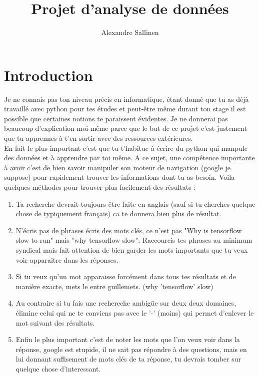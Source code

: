 \documentclass[10pt,a4paper]{book}
\author{Alexandre Sallinen}
\title{Projet d'analyse de données}
\begin{document}
\sloppy

\section{Introduction}

Je ne connais pas ton niveau précis en informatique, étant donné que tu as déjà travaillé avec python pour tes études et peut-être même durant ton stage il est possible que certaines notions te paraissent évidentes. Je ne donnerai pas beaucoup d'explication moi-même parce que le but de ce projet c'est justement que tu apprennes à t'en sortir avec des ressources extérieures.
\\
En fait le plus important c'est que tu t'habitue à écrire du python qui manpule des données et à apprendre par toi même. A ce sujet, une compétence importante à avoir c'est de bien savoir manipuler son moteur de navigation (google je suppose) pour rapidement trouver les informations dont tu as besoin. Voila quelques méthodes pour trouver plus facilement des résultats :
\begin{enumerate}
\item Ta recherche devrait toujours être faite en anglais (sauf si tu cherches quelque chose de typiquement français) ca te donnera bien plus de résultat.

\item N'écris pas de phrases écris des mots clés, ce n'est pas "Why is tensorflow slow to run" mais "why tensorflow slow". Raccourcis tes phrases au minimum syndical mais fait attention de bien garder les mots importants que tu veux voir apparaitre dans les réponses.

\item Si tu veux qu'un mot apparaisse forcément dans tous tes résultats et de manière exacte, mets le entre guillemets. (why 'tensorflow' slow)

\item Au contraire si tu fais une rechereche ambigüe sur deux deux domaines, élimine celui qui ne te conviens pas avec le '-' (moins) qui permet d'enlever le mot suivant des résultats.

\item Enfin le plus important c'est de noter les mots que l'on veux voir dans la réponse, google est stupide, il ne sait pas répondre à des questions, mais en lui donnant suffisement de mots clés de ta réponse, tu devrais tomber sur quelque chose d'interessant.

\end{enumerate}  
\end{document}

